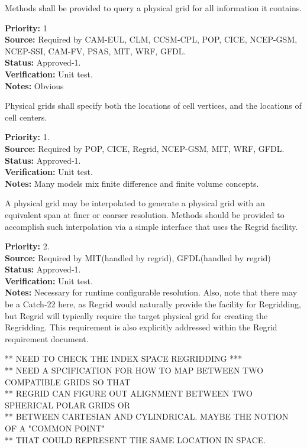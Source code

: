 Methods shall be provided to query a physical grid for all information it contains.
\begin{reqlist}
{\bf Priority:} 1\\
{\bf Source:} Required by CAM-EUL, CLM, CCSM-CPL, POP, CICE, NCEP-GSM, NCEP-SSI,
              CAM-FV, PSAS, MIT, WRF, GFDL. \\
{\bf Status:} Approved-1. \\
{\bf Verification:} Unit test.\\
{\bf Notes:} Obvious
\end{reqlist}

Physical grids shall specify both the locations of cell vertices, and the locations
of cell centers.
\begin{reqlist}
{\bf Priority:} 1. \\
{\bf Source:} Required by POP, CICE, Regrid, NCEP-GSM, MIT, WRF, GFDL. \\
{\bf Status:} Approved-1. \\
{\bf Verification:} Unit test.\\
{\bf Notes:} Many models mix finite difference and finite volume concepts.
\end{reqlist}

A physical grid may be interpolated to generate a physical grid with an equivalent span
 at finer or coarser resolution.  Methods should be provided to accomplish such
interpolation via a simple interface that uses the Regrid facility.
\begin{reqlist}
{\bf Priority:} 2. \\
{\bf Source:} Required by MIT(handled by regrid), GFDL(handled by regrid) \\
{\bf Status:} Approved-1. \\
{\bf Verification:} Unit test.\\
{\bf Notes:} Necessary for runtime configurable resolution.  Also, note that 
there may be a Catch-22 here, as Regrid would naturally provide the facility
for Regridding, but Regrid will typically require the target physical grid for
creating the Regridding.  This requirement is also explicitly addressed within the
Regrid requirement document.

** NEED TO CHECK THE INDEX SPACE REGRIDDING *** \\

** NEED A SPCIFICATION FOR HOW TO MAP BETWEEN TWO COMPATIBLE GRIDS SO THAT \\
** REGRID CAN FIGURE OUT ALIGNMENT BETWEEN TWO SPHERICAL POLAR GRIDS OR \\
** BETWEEN CARTESIAN AND CYLINDRICAL. MAYBE THE NOTION OF A "COMMON POINT" \\
** THAT COULD REPRESENT THE SAME LOCATION IN SPACE. \\
\end{reqlist}

